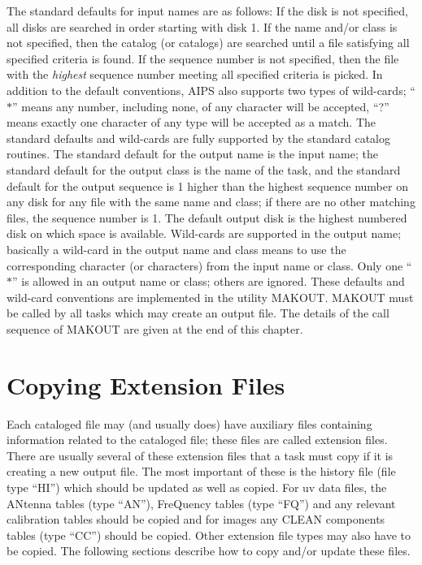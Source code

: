 The standard defaults for input names are as follows:  If the disk is
not specified, all disks are searched in order starting with disk 1.
If the name and/or class is not specified, then the catalog (or
catalogs) are searched until a file satisfying all specified criteria
is found.  If the sequence number is not specified, then the file with
the {\it highest}  sequence number meeting all specified criteria is
picked.  In addition to the default conventions, AIPS also supports
two types of wild-cards; ``$\ast$'' means any number, including none, of any
character will be accepted, ``?'' means exactly one character of any
type will be accepted as a match.  The standard defaults and wild-cards
are fully supported by the standard catalog routines. The standard
default for the output name is the input name; the standard default
for the output class is the name of the task, and the standard default
for the output sequence is 1 higher than the highest sequence number
on any disk for any file with the same name and class; if there are no
other matching files, the sequence number is 1. The default output
disk is the highest numbered disk on which space is available.
Wild-cards are supported in the output name; basically a wild-card in
the output name and class means to use the corresponding character (or
characters) from the input name or class.  Only one ``$\ast$'' is allowed in
an output name or class; others are ignored. These defaults and
wild-card conventions are implemented in the utility MAKOUT. MAKOUT
must be called by all tasks which may create an output file.  The
details of the call sequence of MAKOUT are given at the end of this
chapter.

\section{Copying Extension Files}
 Each cataloged file may (and usually does) have auxiliary files
containing information related to the cataloged file; these files are
called extension files. There are usually several of these extension
files that a task must copy if it is creating a new output file.  The
most important of these is the history file (file type ``HI'') which
should be updated as well as copied.  For uv data files, the ANtenna
tables (type ``AN''), FreQuency tables (type ``FQ'') and any relevant
calibration tables should be copied and for images any CLEAN
components tables (type ``CC'') should be copied.  Other extension
file types may also have to be copied. The following sections describe
how to copy and/or update these files.


